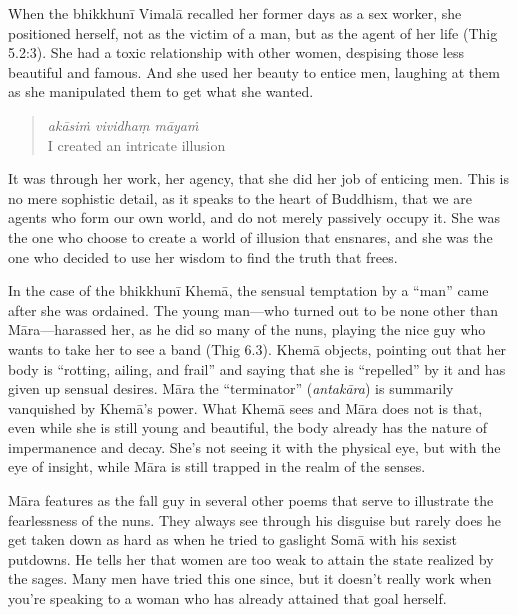 \documentclass[12pt,openany]{book}%
\begin{document}
When the \textsanskrit{bhikkhunī} \textsanskrit{Vimalā} recalled her former days as a sex worker, she positioned herself, not as the victim of a man, but as the agent of her life (Thig 5.2:3). She had a toxic relationship with other women, despising those less beautiful and famous. And she used her beauty to entice men, laughing at them as she manipulated them to get what she wanted.

\begin{quotation}%
\textit{\textsanskrit{akāsiṁ} vividhaṃ \textsanskrit{māyaṁ}} \\
I created an intricate illusion

%
\end{quotation}

It was through her work, her agency, that she did her job of enticing men. This is no mere sophistic detail, as it speaks to the heart of Buddhism, that we are agents who form our own world, and do not merely passively occupy it. She was the one who choose to create a world of illusion that ensnares, and she was the one who decided to use her wisdom to find the truth that frees.

In the case of the \textsanskrit{bhikkhunī} \textsanskrit{Khemā}, the sensual temptation by a “man” came after she was ordained. The young man—who turned out to be none other than \textsanskrit{Māra}—harassed her, as he did so many of the nuns, playing the nice guy who wants to take her to see a band (Thig 6.3). \textsanskrit{Khemā} objects, pointing out that her body is “rotting, ailing, and frail” and saying that she is “repelled” by it and has given up sensual desires. \textsanskrit{Māra} the “terminator” (\textit{\textsanskrit{antakāra}}) is summarily vanquished by \textsanskrit{Khemā}’s power. What \textsanskrit{Khemā} sees and \textsanskrit{Māra} does not is that, even while she is still young and beautiful, the body already has the nature of impermanence and decay. She’s not seeing it with the physical eye, but with the eye of insight, while \textsanskrit{Māra} is still trapped in the realm of the senses.

\textsanskrit{Māra} features as the fall guy in several other poems that serve to illustrate the fearlessness of the nuns. They always see through his disguise but rarely does he get taken down as hard as when he tried to gaslight \textsanskrit{Somā} with his sexist putdowns. He tells her that women are too weak to attain the state realized by the sages. Many men have tried this one since, but it doesn’t really work when you’re speaking to a woman who has already attained that goal herself.
\end{document}
